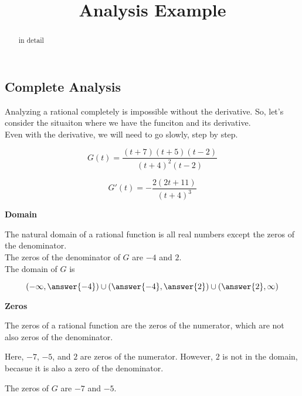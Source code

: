 \documentclass{ximera}
\title{Analysis Example}
\begin{document}
\begin{abstract}
in detail
\end{abstract}
\maketitle





\subsection*{Complete Analysis}


Analyzing a rational completely is impossible without the derivative. So, let's consider the situaiton where we have the funciton and its derivative. \\

Even with the derivative, we will need to go slowly, step by step.



\[
G(t) = \frac{(t+7)(t+5)(t-2)}{(t+4)^2(t-2)}
\]

\[
G'(t) = -\frac{2(2t+11)}{(t+4)^3}
\]



\textbf{\textcolor{purple!85!blue}{Domain}} \\

\begin{explanation}

The natural domain of a rational function is all real numbers except the zeros of the denominator. \\

The zeros of the denominator of $G$ are $-4$ and $2$. \\


The domain of $G$ is 

\[
\left( -\infty, \answer{-4} \right) \cup \left(\answer{-4}, \answer{2} \right) \cup \left( \answer{2}, \infty \right)
\]


\end{explanation}









\textbf{\textcolor{purple!85!blue}{Zeros}} \\
\begin{explanation}

The zeros of a rational function are the zeros of the numerator, which are not also zeros of the denominator.


Here, $-7$, $-5$, and $2$ are zeros of the numerator.  However, $2$ is not in the domain, becasue it is also a zero of the denominator.


The zeros of $G$ are $-7$ and $-5$.


\end{explanation}
\end{document}
